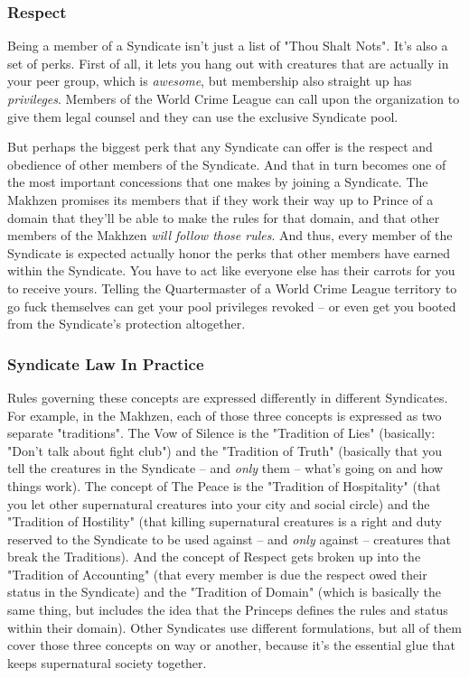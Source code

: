 \subsubsection{Respect}
\hspace{\parindent} Being a member of a Syndicate isn't just a list of "Thou Shalt Nots". It's also a set of perks. First of all, it lets you hang out with creatures that are actually in your peer group, which is \textit{awesome}, but membership also straight up has \textit{privileges}. Members of the World Crime League can call upon the organization to give them legal counsel and they can use the exclusive Syndicate pool. 

But perhaps the biggest perk that any Syndicate can offer is the respect and obedience of other members of the Syndicate. And that in turn becomes one of the most important concessions that one makes by joining a Syndicate. The Makhzen promises its members that if they work their way up to Prince of a domain that they'll be able to make the rules for that domain, and that other members of the Makhzen \textit{will follow those rules}. And thus, every member of the Syndicate is expected actually honor the perks that other members have earned within the Syndicate. You have to act like everyone else has their carrots for you to receive yours. Telling the Quartermaster of a World Crime League territory to go fuck themselves can get your pool privileges revoked -- or even get you booted from the Syndicate's protection altogether.

\subsubsection{Syndicate Law In Practice}
\hspace{\parindent} Rules governing these concepts are expressed differently in different Syndicates. For example, in the Makhzen, each of those three concepts is expressed as two separate "traditions". The Vow of Silence is the "Tradition of Lies" (basically: "Don't talk about fight club") and the "Tradition of Truth" (basically that you tell the creatures in the Syndicate -- and \textit{only} them -- what's going on and how things work). The concept of The Peace is the "Tradition of Hospitality" (that you let other supernatural creatures into your city and social circle) and the "Tradition of Hostility" (that killing supernatural creatures is a right and duty reserved to the Syndicate to be used against -- and \textit{only} against -- creatures that break the Traditions). And the concept of Respect gets broken up into the "Tradition of Accounting" (that every member is due the respect owed their status in the Syndicate) and the "Tradition of Domain" (which is basically the same thing, but includes the idea that the Princeps defines the rules and status within their domain). Other Syndicates use different formulations, but all of them cover those three concepts on way or another, because it's the essential glue that keeps supernatural society together.
